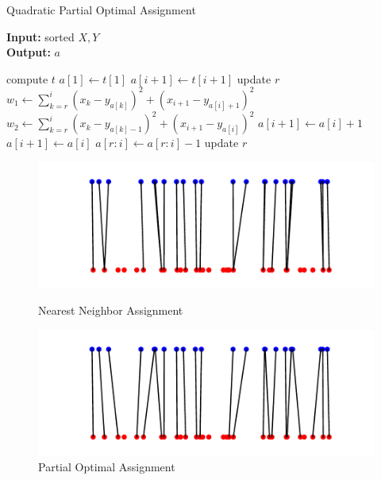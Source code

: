 \documentclass[11pt]{beamer}
\begin{document}
\begin{frame}

\begin{algorithm}[H]
\caption{Quadratic Partial Optimal Assignment}\label{a_quad}
\begin{multicols}{2}
\scriptsize
\hspace*{\algorithmicindent} \textbf{Input:} sorted $X,Y$\\
\hspace*{\algorithmicindent} \textbf{Output:} $a$ 
\begin{algorithmic}[2]
\State compute $t$
\State $a[1] \gets t[1]$
		\State $a[i+1] \gets t[i+1]$
		\State update $r$
    \Else
        \State $w_1 \gets \sum_{k=r}^{i} (x_k - y_{a[k]})^2 + (x_{i+1} - y_{a[i]+1})^2$
        \State $w_2 \gets \sum_{k=r}^{i} (x_k - y_{a[k]-1})^2 + (x_{i+1} - y_{a[i]})^2$
         
        	\State $a[i+1] \gets a[i]+1$
        \Else {}
        	\State $a[i+1] \gets a[i]$
        	\State $a[r:i] \gets a[r:i]-1$
        	\State update $r$
        \EndIf
    \EndIf
\EndFor
\State {}
\end{algorithmic}
\end{multicols}
\end{algorithm}
\end{frame}

\begin{frame}
\begin{figure}[H]
\includegraphics[scale=0.45]{t_fig.pdf}
\caption{Nearest Neighbor Assignment}\label{t_fig}
\includegraphics[scale=0.45]{a_fig.pdf}
\caption{Partial Optimal Assignment}\label{a_fig}
\end{figure}
\end{frame}
\end{document}
